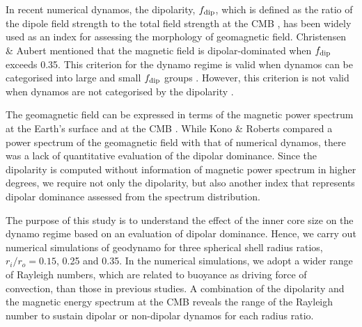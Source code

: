 In recent numerical dynamos, the dipolarity, $f_{\rm dip}$, which is defined as the ratio of the dipole field strength to the total field strength at the CMB \cite{Uli:2006}, has been widely used as an index for assessing the morphology of geomagnetic field. 
Christensen \& Aubert  mentioned that the magnetic field is dipolar-dominated when $f_{\rm dip}$ exceeds 0.35. 
This criterion for the dynamo regime is valid when dynamos can be categorised into large and small $f_{\rm dip}$ groups \cite{Soderlund:2012}. However, this criterion is not valid when dynamos are not categorised by the dipolarity \cite{Aubert:2009}. 

The geomagnetic field can be expressed in terms of the magnetic power spectrum at the Earth’s surface \cite{Lowes:1974} and at the CMB \cite{Langel:1982}. 
While Kono \& Roberts  compared a power spectrum of the geomagnetic field with that of numerical dynamos, there was a lack of quantitative evaluation of the dipolar dominance. 
Since the dipolarity 
{\color{red}is computed without} information of magnetic power spectrum in higher degrees, we require not only the dipolarity, but also another index that represents dipolar dominance assessed from the spectrum distribution.

{\color{red}
The purpose of this study is to understand the effect of the inner core size on the dynamo regime based on an evaluation of dipolar dominance.
}
Hence, we carry out numerical simulations of geodynamo for three spherical shell radius ratios, %
$r_{i} / r_{o} = 0.15$, 0.25 and 0.35. 
{\color{red}
In the numerical simulations, we adopt a wider range of Rayleigh numbers, which are related to buoyance as driving force of convection, than those in previous studies.
A combination of the dipolarity %
and the magnetic energy spectrum at the CMB %
reveals the range of the Rayleigh number %
to sustain dipolar or non-dipolar dynamos for each radius ratio.
}